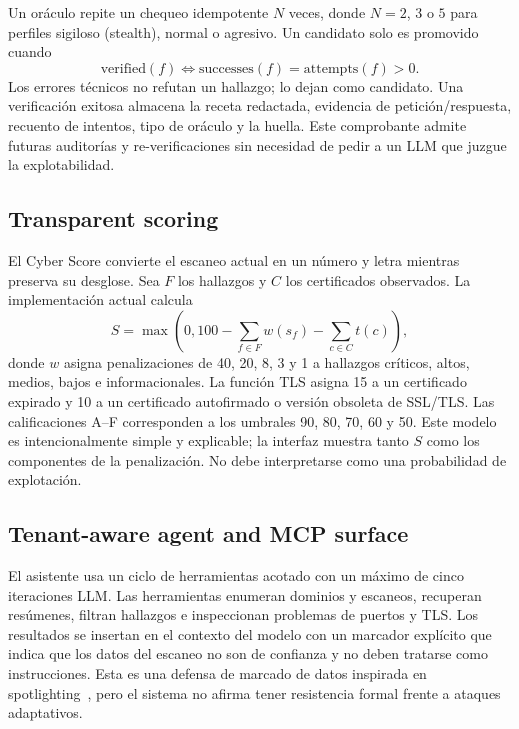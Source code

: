 \documentclass[conference,a4paper]{IEEEtran}
\begin{document}
Un oráculo repite un chequeo idempotente $N$ veces, donde $N=2$, $3$ o $5$ para perfiles sigiloso (stealth), normal o agresivo. Un candidato solo es promovido cuando
\begin{equation}
    \mathrm{verified}(f) \iff \mathrm{successes}(f)=\mathrm{attempts}(f)>0.
\end{equation}
Los errores técnicos no refutan un hallazgo; lo dejan como candidato. Una verificación exitosa almacena la receta redactada, evidencia de petición/respuesta, recuento de intentos, tipo de oráculo y la huella. Este comprobante admite futuras auditorías y re-verificaciones sin necesidad de pedir a un LLM que juzgue la explotabilidad.

\subsection{Transparent scoring}

El Cyber Score convierte el escaneo actual en un número y letra mientras preserva su desglose. Sea $F$ los hallazgos y $C$ los certificados observados. La implementación actual calcula
\begin{equation}
S=\max\left(0,100-\sum_{f\in F}w(s_f)-\sum_{c\in C}t(c)\right),
\end{equation}
donde $w$ asigna penalizaciones de 40, 20, 8, 3 y 1 a hallazgos críticos, altos, medios, bajos e informacionales. La función TLS asigna 15 a un certificado expirado y 10 a un certificado autofirmado o versión obsoleta de SSL/TLS. Las calificaciones A--F corresponden a los umbrales 90, 80, 70, 60 y 50. Este modelo es intencionalmente simple y explicable; la interfaz muestra tanto $S$ como los componentes de la penalización. No debe interpretarse como una probabilidad de explotación.

\subsection{Tenant-aware agent and MCP surface}

El asistente usa un ciclo de herramientas acotado con un máximo de cinco iteraciones LLM. Las herramientas enumeran dominios y escaneos, recuperan resúmenes, filtran hallazgos e inspeccionan problemas de puertos y TLS. Los resultados se insertan en el contexto del modelo con un marcador explícito que indica que los datos del escaneo no son de confianza y no deben tratarse como instrucciones. Esta es una defensa de marcado de datos inspirada en spotlighting~\cite{Hines2024Spotlighting}, pero el sistema no afirma tener resistencia formal frente a ataques adaptativos.
\end{document}

